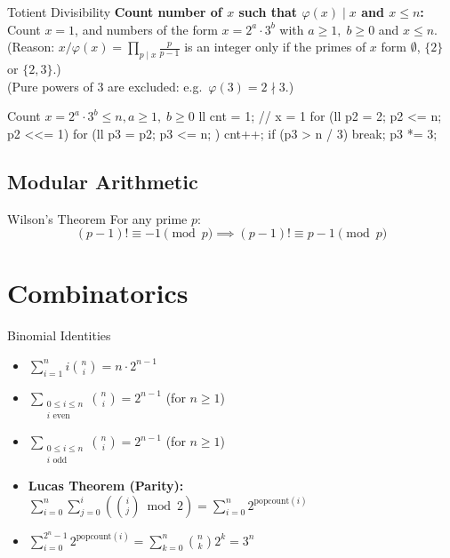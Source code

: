 \documentclass[10pt]{article}
\newcommand{\complexity}[1]{%
  \tcbox[on line,
    colback=tagbg,
    colframe=tagbg,
    boxrule=0pt,
    arc=2pt,
    boxsep=0pt,
    left=3.5pt, right=3.5pt, top=1.5pt, bottom=1.5pt
  ]{\color{tagtext}\scriptsize\bfseries\ensuremath{#1}}%
}
\begin{document}
\begin{conceptbox}{Totient Divisibility}
    \textbf{Count number of $x$ such that $\varphi(x) \mid x$ and $x \leq n$:} \\
    Count $x = 1$, and numbers of the form $x = 2^a \cdot 3^b$ with $a \geq 1,\; b \geq 0$ and $x \leq n$. (Reason: $x/\varphi(x) = \prod_{p \mid x} \frac{p}{p-1}$ is an integer only if the primes of $x$ form $\emptyset$, $\{2\}$ or $\{2, 3\}$.)\\
    (Pure powers of 3 are excluded: e.g.\ $\varphi(3) = 2 \nmid 3$.)
\end{conceptbox}

\begin{vscode}{Count $x = 2^a \cdot 3^b \leq n, a \geq 1,\; b \geq 0$ \complexity{O(\log^2 n)}}
ll cnt = 1; // x = 1
for (ll p2 = 2; p2 <= n; p2 <<= 1) 
{
    for (ll p3 = p2; p3 <= n; ) 
    {
        cnt++;
        if (p3 > n / 3) 
            break; 
        p3 *= 3;
    }
}
\end{vscode}
\subsection{Modular Arithmetic}

\begin{conceptbox}{Wilson's Theorem}
    For any prime $p$:
    \[ (p - 1)! \equiv -1 \pmod{p} \implies (p - 1)! \equiv p - 1 \pmod{p} \]
\end{conceptbox}

\newpage
\section{Combinatorics}

\begin{conceptbox}{Binomial Identities}
    \begin{itemize}
        \item $\sum_{i = 1}^{n} i \binom{n}{i} = n \cdot 2^{n - 1}$
        \item $\sum_{\substack{0 \le i \le n \\ i \text{ even}}} \binom{n}{i} = 2^{n - 1}$ \quad (for $n \ge 1$)
        \item $\sum_{\substack{0 \le i \le n \\ i \text{ odd}}} \binom{n}{i} = 2^{n - 1}$ \quad (for $n \ge 1$)
        \item \textbf{Lucas Theorem (Parity):} $\sum_{i=0}^n \sum_{j=0}^i \left( \binom{i}{j} \bmod 2 \right) = \sum_{i=0}^n 2^{\text{popcount}(i)}$
        \item $\sum_{i=0}^{2^n-1} 2^{\text{popcount}(i)} = \sum_{k=0}^n \binom{n}{k} 2^k = 3^n$
    \end{itemize}
\end{conceptbox}
\end{document}
